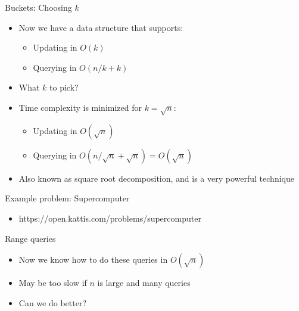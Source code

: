 \documentclass{beamer}
\begin{document}
\begin{frame}[plain]{Buckets: Choosing $k$}
    \begin{itemize}
        \item<1-> Now we have a data structure that supports:
            \begin{itemize}
                \item<2-> Updating in $O(k)$
                \item Querying in $O(n/k + k)$
            \end{itemize}
        \item<3-> What $k$ to pick?
        \item<4-> Time complexity is minimized for $k=\sqrt{n}$:
            \begin{itemize}
                \item<5-> Updating in $O(\sqrt{n})$
                \item<6-> Querying in $O(n/\sqrt{n} + \sqrt{n}) = O(\sqrt{n})$
            \end{itemize}
        \item<7-> Also known as square root decomposition, and is a very
            powerful technique
    \end{itemize}
\end{frame}

\begin{frame}[plain]{Example problem: Supercomputer}
    \begin{itemize}
        \item https://open.kattis.com/problems/supercomputer
    \end{itemize}
\end{frame}

\begin{frame}[plain]{Range queries}
    \begin{itemize}
        \item<1-> Now we know how to do these queries in $O(\sqrt{n})$
        \item<2-> May be too slow if $n$ is large and many queries
        \vspace{10pt}
        \item<3-> Can we do better?
    \end{itemize}
\end{frame}
\end{document}
